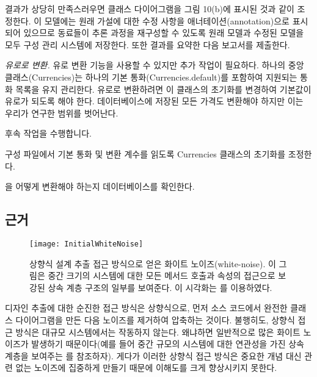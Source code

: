 \documentclass[a4paper,10pt,twoside]{book}
\begin{document}
결과가 상당히 만족스러우면 클래스 다이어그램을 그림 10(b)에 표시된 것과 같이 조정한다. 이 모델에는 원래 가설에 대한 수정 사항을 애너테이션(annotation)으로 표시되어 있으므로 동료들이 추론 과정을 재구성할 수 있도록 원래 모델과 수정된 모델을 모두 구성 관리 시스템에 저장한다. 또한 결과를 요약한 다음 보고서를 제출한다.

\noindent
\emph{유로로 변환.}
유로 변환 기능을 사용할 수 있지만 추가 작업이 필요하다. 하나의 중앙 클래스(Currencies)는 하나의 기본 통화(Currencies.default)를 포함하여 지원되는 통화 목록을 유지 관리한다. 유로로 변환하려면 이 클래스의 초기화를 변경하여 기본값이 유로가 되도록 해야 한다. 데이터베이스에 저장된 모든 가격도 변환해야 하지만 이는 우리가 연구한 범위를 벗어난다.

후속 작업을 수행합니다.

\begin{bulletlist}
\item 구성 파일에서 기본 통화 및 변환 계수를 읽도록 Currencies 클래스의 초기화를 조정한다.

\item {}을 어떻게 변환해야 하는지 데이터베이스를 확인한다.
\end{bulletlist}

\subsection*{근거}

\begin{figure}
\begin{center}
\texttt{[image: InitialWhiteNoise]}
\caption{상향식 설계 추출 접근 방식으로 얻은 화이트 노이즈(white-noise). 이 그림은 중간 크기의 시스템에 대한 모든 메서드 호출과 속성의 접근으로 보강된 상속 계층 구조의 일부를 보여준다. 이 시각화는  \cite{Deme99c} \cite{Lanz99a}를 이용하였다.}
\end{center}
\end{figure}

디자인 추출에 대한 순진한 접근 방식은 상향식으로, 먼저 소스 코드에서 완전한 클래스 다이어그램을 만든 다음 노이즈를 제거하여 압축하는 것이다. 불행히도, 상향식 접근 방식은 대규모 시스템에서는 작동하지 않는다. 왜냐하면 일반적으로 많은 화이트 노이즈가 발생하기 때문이다(예를 들어 중간 규모의 시스템에 대한 연관성을 가진 상속 계층을 보여주는 를 참조하자). 게다가 이러한 상향식 접근 방식은 중요한 개념 대신 관련 없는 노이즈에 집중하게 만들기 때문에 이해도를 크게 향상시키지 못한다.
\end{document}

